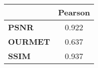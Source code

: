\begin{tabular}{|l|c|}
\hline
&\textbf{Pearson}\\\hline
\textbf{PSNR}&0.922\\\hline
\textbf{OURMET}&0.637\\\hline
\textbf{SSIM}&0.937\\\hline
\end{tabular}
